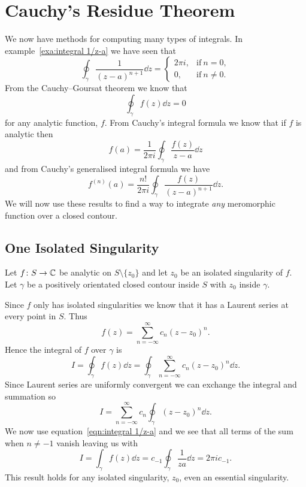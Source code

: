 \documentclass{article}
\begin{document}
    \section{Cauchy's Residue Theorem}
    We now have methods for computing many types of integrals.
    In example~\ref{exa:integral 1/z-a} we have seen that
    \begin{equation}\label{eqn:integral 1/z-a}
        \oint_{\gamma} \frac{1}{(z - a)^{n+1}}\dd{z} =
        \begin{cases}
            2\pi i, & \text{if}~n=0,\\
            0, & \text{if}~n\ne 0.
        \end{cases}
    \end{equation}
    From the Cauchy--Goursat theorem we know that
    \[\oint_{\gamma} f(z)\dd{z} = 0\]
    for any analytic function, \(f\).
    From Cauchy's integral formula we know that if \(f\) is analytic then
    \[f(a) = \frac{1}{2\pi i} \oint_{\gamma} \frac{f(z)}{z - a}\dd{z}\]
    and from Cauchy's generalised integral formula we have
    \[f^{(n)}(a) = \frac{n!}{2\pi i} \oint_{\gamma} \frac{f(z)}{(z - a)^{n+1}}\dd{z}.\]
    We will now use these results to find a way to integrate \emph{any} meromorphic function over a closed contour.
    
    \subsection{One Isolated Singularity}
    Let \(f\colon S\to\mathbb{C}\) be analytic on \(S\setminus\{z_0\}\) and let \(z_0\) be an isolated singularity of \(f\).
    Let \(\gamma\) be a positively orientated closed contour inside \(S\) with \(z_0\) inside \(\gamma\).
    
    Since \(f\) only has isolated singularities we know that it has a Laurent series at every point in \(S\).
    Thus
    \[f(z) = \sum_{n=-\infty}^{\infty}c_n(z - z_0)^n.\]
    Hence the integral of \(f\) over \(\gamma\) is
    \[I = \oint_{\gamma} f(z) \dd{z} = \oint_{\gamma} \sum_{n=-\infty}^{\infty} c_n(z - z_0)^n \dd{z}.\]
    Since Laurent series are uniformly convergent we can exchange the integral and summation so
    \[I = \sum_{n=-\infty}^{\infty} c_n \oint_{\gamma} (z - z_0)^n \dd{z}.\]
    We now use equation~\ref{eqn:integral 1/z-a} and we see that all terms of the sum when \(n \ne -1\) vanish leaving us with
    \[I = \int_{\gamma} f(z) \dd{z} = c_{-1}\oint_{\gamma} \frac{1}{z  a} \dd{z} = 2\pi i c_{-1}.\]
    This result holds for any isolated singularity, \(z_0\), even an essential singularity.
    
\end{document}
